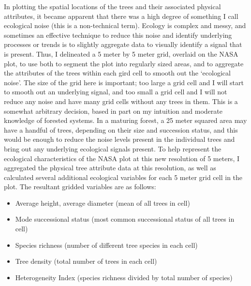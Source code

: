 \documentclass[12pt,a4paper]{article}
\begin{document}
In plotting the spatial locations of the trees and their associated physical attributes, it became apparent that there was a high degree of something I call ecological noise (this is a non-technical term).  Ecology is complex and messy, and sometimes an effective technique to reduce this noise and identify underlying processes or trends is to slightly aggregate data to visually identify a signal that is present.  Thus, I delineated a 5 meter by 5 meter grid, overlaid on the NASA plot, to use both to segment the plot into regularly sized areas, and to aggregate the attributes of the trees within each gird cell to smooth out the `ecological noise'.  The size of the grid here is important; too large a grid cell and I will start to smooth out an underlying signal, and too small a grid cell and I will not reduce any noise and have many grid cells without any trees in them.  This is a somewhat arbitrary decision, based in part on my intuition and moderate knowledge of forested systems.  In a maturing forest, a 25 meter squared area may have a handful of trees, depending on their size and succession status, and this would be enough to reduce the noise levels present in the individual trees and bring out any underlying ecological signals present.  To help represent the ecological characteristics of the NASA plot at this new resolution of 5 meters, I aggregated the physical tree attribute data at this resolution, as well as calculated several additional ecological variables for each 5 meter grid cell in the plot.  The resultant gridded variables are as follows:

\begin{itemize}
\item Average height, average diameter (mean of all trees in cell)
\item Mode successional status (most common successional status of all trees in cell)
\item Species richness (number of different tree species in each cell)
\item Tree density (total number of trees in each cell)
\item Heterogeneity Index (species richness divided by total number of species)
\end{itemize}
\end{document}

